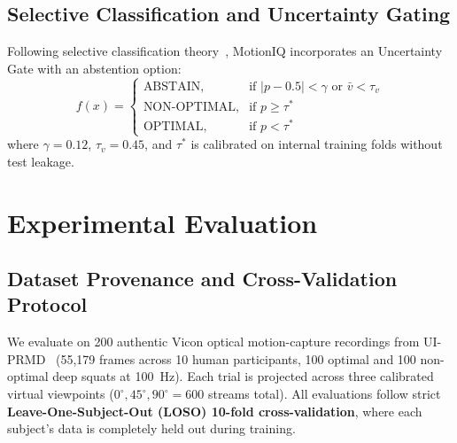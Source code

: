 \documentclass[10pt,journal,compsoc]{IEEEtran}
\begin{document}
\subsection{Selective Classification and Uncertainty Gating}
Following selective classification theory~\cite{geifman2017selective}, MotionIQ incorporates an Uncertainty Gate with an abstention option:
\begin{equation}
f(x) = \begin{cases}
\text{ABSTAIN}, & \text{if } |p - 0.5| < \gamma \text{ or } \bar{v} < \tau_v \\
\text{NON-OPTIMAL}, & \text{if } p \ge \tau^* \\
\text{OPTIMAL}, & \text{if } p < \tau^*
\end{cases}
\end{equation}
where $\gamma = 0.12$, $\tau_v = 0.45$, and $\tau^*$ is calibrated on internal training folds without test leakage.

\section{Experimental Evaluation}

\subsection{Dataset Provenance and Cross-Validation Protocol}
We evaluate on 200 authentic Vicon optical motion-capture recordings from UI-PRMD~\cite{vakanski2018data} (55,179 frames across 10 human participants, 100 optimal and 100 non-optimal deep squats at 100~Hz). Each trial is projected across three calibrated virtual viewpoints ($0^\circ, 45^\circ, 90^\circ = 600$ streams total).
All evaluations follow strict \textbf{Leave-One-Subject-Out (LOSO) 10-fold cross-validation}, where each subject's data is completely held out during training.
\end{document}
